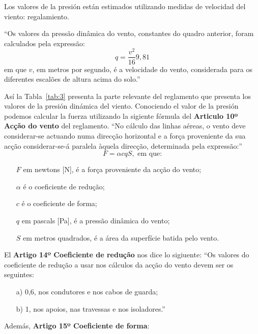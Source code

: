 Los valores de la presión están estimados utilizando medidas de
velocidad del viento:
regalamiento.

``Os valores da pressão dinâmica do vento, constantes do quadro
anterior, foram calculados pela expressão:
\begin{equation}
  \label{eq:6}
  q = \frac{v^2}{16}9,81
\end{equation}
em que $v$, em metros por segundo, é a velocidade do vento,
considerada para os diferentes escalões de altura acima do solo.''

Así la Tabla~\ref{tab:3} presenta la parte
relevante del reglamento que presenta los valores de la presión
dinámica del viento. Conociendo el valor de la presión podemos
calcular la fuerza utilizando la sigiente fórmula del {\bf Articulo
  10º Acção do vento} del reglamento.  ``No cálculo das linhas aéreas,
o vento deve considerar-se actuando numa direcção horizontal e a força
proveniente da sua acção considerar-se-á paralela àquela direcção,
determinada pela expressão:''
\begin{equation}
  \label{eq:5}
  F = \alpha c q S, \textrm{ em que:}
\end{equation} 
\begin{itemize}[noitemsep,nolistsep]
\item[$F$] em newtons [\si{N}], é a força proveniente da acção do vento;
\item[$\alpha$] é o coeficiente de redução;
\item[$c$] é o coeficiente de forma;
\item[$q$] em pascals [\si{Pa}], é a pressão dinâmica do vento;
\item[$S$] em metros quadrados, é a área da superfície batida pelo vento.
\end{itemize}



El {\bf Artigo 14º Coeficiente de redução} nos dice lo sigiuente:
``Os valores do coeficiente de redução a usar nos cálculos da acção do vento devem ser os seguintes:
\begin{itemize}[noitemsep,nolistsep]
\item[a)] 0,6, nos condutores e nos cabos de guarda; 
\item[b)] 1, nos apoios, nas travessas e nos isoladores.''
\end{itemize}
  
Además, {\bf Artigo 15º Coeficiente de forma}:

